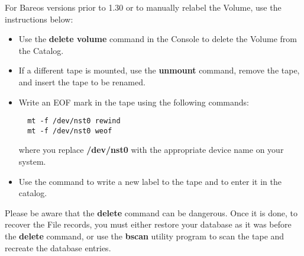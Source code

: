 For Bareos versions prior to 1.30 or to manually relabel the Volume, use the
instructions below:

\begin{itemize}
\item Use the {\bf delete volume} command in the Console  to delete the Volume
   from the Catalog.
\item If a different tape is mounted, use the {\bf unmount}  command,
   remove the tape, and insert the tape to be  renamed.
\item Write an EOF mark in the tape using the following  commands:

\footnotesize
\begin{verbatim}
  mt -f /dev/nst0 rewind
  mt -f /dev/nst0 weof
\end{verbatim}
\normalsize

where you replace {\bf /dev/nst0} with the appropriate  device name on your
system.
\item Use the  command to write a new label to  the tape and to
   enter it in the catalog.
\end{itemize}

Please be aware that the {\bf delete} command can be dangerous. Once it is
done, to recover the File records, you must either restore your database as it
was before the {\bf delete} command, or use the {\bf bscan} utility program to
scan the tape and recreate the database entries.
